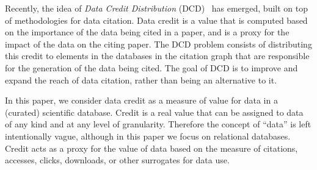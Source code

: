 Recently, the idea of \emph{Data Credit Distribution} (DCD)~\citep{creditFang18,transitiveCreditKatz2014,zeng2020assigning} has emerged, built on top of methodologies for data citation. 
Data credit is a value that is computed based on the importance of the data being cited in a paper, and is a proxy for the impact of the data on the citing paper. 
The DCD problem consists of distributing this credit to elements in the databases in the citation graph that are responsible for the generation of the data being cited. The goal of DCD is to improve and expand the reach of data citation, rather than being an alternative to it. %


In this paper, \textcolor{correction}{we consider data credit as a measure of value for data} in a (curated) scientific database.  
\textcolor{correction}{Credit is a real value that can be assigned} to data of any kind and at any level of granularity. Therefore the concept of ``data'' is left intentionally vague, although in this paper we focus on relational databases.
Credit acts as a proxy for the value of data based on the measure of citations, accesses, clicks, downloads, or other surrogates for data use. 

